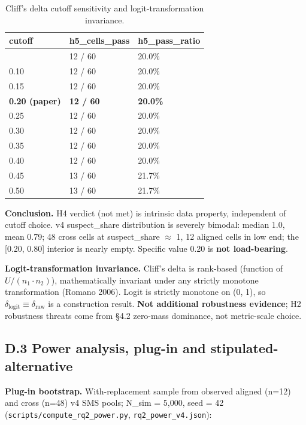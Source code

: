 \documentclass[manuscript,screen,review]{acmart}
\begin{document}
{%
\begin{longtable}[]{@{}lll@{}}
\caption{Cliff's delta cutoff sensitivity and logit-transformation invariance.}\label{tab:p2-22}\\
\toprule\noalign{}
cutoff & h5\_cells\_pass & h5\_pass\_ratio \\
\midrule\noalign{}
\endfirsthead
\endhead
\bottomrule\noalign{}
\endlastfoot
0.05 & 12 / 60 & 20.0\% \\
0.10 & 12 / 60 & 20.0\% \\
0.15 & 12 / 60 & 20.0\% \\
\textbf{0.20 (paper)} & \textbf{12 / 60} & \textbf{20.0\%} \\
0.25 & 12 / 60 & 20.0\% \\
0.30 & 12 / 60 & 20.0\% \\
0.35 & 12 / 60 & 20.0\% \\
0.40 & 12 / 60 & 20.0\% \\
0.45 & 13 / 60 & 21.7\% \\
0.50 & 13 / 60 & 21.7\% \\
\end{longtable}
}

\textbf{Conclusion.} H4 verdict (not met) is intrinsic data property,
independent of cutoff choice. v4 suspect\_share distribution is severely
bimodal: median 1.0, mean 0.79; 48 cross cells at suspect\_share $\approx$ 1, 12
aligned cells in low end; the {[}0.20, 0.80{]} interior is nearly empty.
Specific value 0.20 is \textbf{not load-bearing}.

\textbf{Logit-transformation invariance.} Cliff's delta is rank-based
(function of $U / (n_1 \cdot n_2)$), mathematically invariant under any strictly
monotone transformation (Romano 2006). Logit is strictly monotone on (0,
1), so $\delta_{\mathrm{logit}} \equiv \delta_{\mathrm{raw}}$ is a construction result. \textbf{Not
additional robustness evidence}; H2 robustness threats come from §4.2
zero-mass dominance, not metric-scale choice.

\subsection{D.3 Power analysis, plug-in and stipulated-alternative}\label{d.3-power-analysis-plug-in-and-stipulated-alternative}

\textbf{Plug-in bootstrap.} With-replacement sample from observed
aligned (n=12) and cross (n=48) v4 SMS pools; N\_sim = 5,000, seed = 42
(\texttt{scripts/compute\_rq2\_power.py}, \texttt{rq2\_power\_v4.json}):
\end{document}

